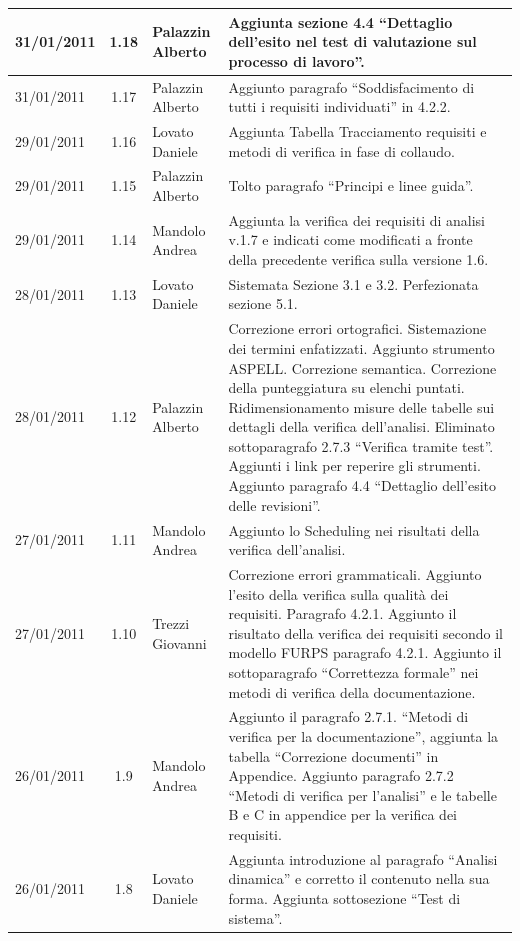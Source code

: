 \begin{longtable}{|p{}|c|p{}|p{}|}
\hline
31/01/2011 & 1.18 & Palazzin Alberto & Aggiunta sezione 4.4 ``Dettaglio
dell'esito nel test di valutazione sul processo di lavoro''.\\
\hline
31/01/2011 & 1.17 & Palazzin Alberto & Aggiunto paragrafo ``Soddisfacimento di
tutti i requisiti individuati'' in 4.2.2.\\
\hline
29/01/2011 & 1.16 & Lovato Daniele & Aggiunta Tabella Tracciamento requisiti e
metodi di verifica in fase di collaudo.\\
\hline
29/01/2011 & 1.15 & Palazzin Alberto & Tolto paragrafo ``Principi e linee
guida''.\\
\hline
29/01/2011 & 1.14 & Mandolo Andrea & Aggiunta la verifica dei requisiti di
analisi v.1.7 e indicati come modificati a fronte della precedente verifica
sulla versione 1.6.\\
\hline
28/01/2011 & 1.13 & Lovato Daniele & Sistemata Sezione 3.1 e 3.2.
Perfezionata sezione 5.1.\\
\hline
28/01/2011 & 1.12 & Palazzin Alberto & Correzione errori ortografici.
Sistemazione dei termini enfatizzati. Aggiunto strumento ASPELL. Correzione
semantica. Correzione della punteggiatura su elenchi puntati.
Ridimensionamento misure delle tabelle sui dettagli della verifica
dell'analisi. Eliminato sottoparagrafo 2.7.3 ``Verifica tramite test''.
Aggiunti i link per reperire gli strumenti. Aggiunto paragrafo 4.4 ``Dettaglio
dell'esito delle revisioni''.\\
\hline
27/01/2011 & 1.11 & Mandolo Andrea & Aggiunto lo Scheduling nei risultati
della verifica dell'analisi.\\
\hline
27/01/2011 & 1.10 & Trezzi Giovanni & Correzione errori grammaticali. Aggiunto
l'esito della verifica sulla qualit\`a dei requisiti. Paragrafo 4.2.1. Aggiunto
il risultato della verifica dei requisiti secondo il modello FURPS paragrafo
4.2.1. Aggiunto il sottoparagrafo ``Correttezza formale'' nei metodi di
verifica della documentazione.\\
\hline
26/01/2011 & 1.9 & Mandolo Andrea & Aggiunto
il paragrafo 2.7.1. ``Metodi di verifica per la documentazione'', aggiunta la
tabella ``Correzione documenti'' in Appendice. Aggiunto paragrafo 2.7.2 ``Metodi
di verifica per l'analisi'' e le tabelle B e C in appendice per la verifica dei requisiti.\\
\hline
26/01/2011 & 1.8 & Lovato Daniele & Aggiunta introduzione al paragrafo
``Analisi dinamica'' e corretto il contenuto nella sua forma. Aggiunta
sottosezione ``Test di sistema''.\\

\end{longtable}
